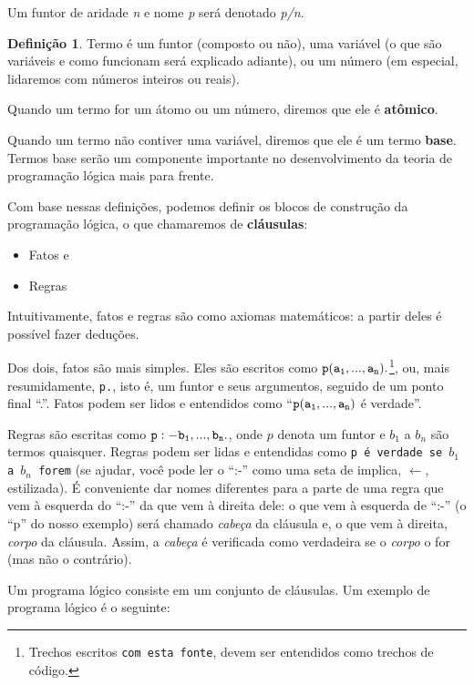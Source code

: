 \documentclass{article}
\theoremstyle{definition}
\newtheorem{definition}{Definição}[section]
\theoremstyle{remark}
\begin{document}
    Um funtor de aridade \textit{n} e nome \textit{p} será denotado \textit{p/n}.



  \theoremstyle{definition}
  \begin{definition}{Termo}
     é um funtor (composto ou não), uma variável (o que são variáveis e como funcionam será explicado adiante), ou um número (em especial, lidaremos com números inteiros ou reais).
  \end{definition}

  Quando um termo for um átomo ou um número, diremos que ele é \textbf{atômico}.

Quando um termo não contiver uma variável, diremos que ele é um termo \textbf{base}.
Termos base serão um componente importante no desenvolvimento da teoria de programação lógica mais para frente.

Com base nessas definições, podemos definir os blocos de construção da programação lógica, o que chamaremos de \textbf{cláusulas}:
\begin{itemize}
  \item Fatos e
  \item Regras
\end{itemize}

Intuitivamente, fatos e regras são como axiomas matemáticos: a partir deles é possível fazer deduções.

Dos dois, fatos são mais simples. Eles são escritos como  ${\tt p(a_1, ..., a_n).}$\footnote{Trechos escritos {\tt com esta fonte}, devem ser entendidos como trechos de código.},  ou, mais resumidamente, {\tt p.}, isto é, um funtor e seus argumentos, seguido de um ponto final ``.''. Fatos podem ser lidos e entendidos como ``${\tt p(a_1, ..., a_n)}$ é verdade''.

Regras são escritas como ${\tt p :- b_1, ..., b_n.}$, onde $p$ denota um funtor e $b_1$ a $b_n$ são termos quaisquer. Regras podem ser lidas e entendidas como {\tt p é verdade se $b_1$ a $b_n$ forem} (se ajudar, você pode ler o ``:-'' como uma seta de implica, $\leftarrow$, estilizada). É conveniente dar nomes diferentes para a parte de uma regra que vem à esquerda do ``:-'' da que vem à direita dele: o que vem à esquerda de ``:-'' (o ``p'' do nosso exemplo) será chamado \textit{cabeça} da cláusula e, o que vem à direita, \textit{corpo} da cláusula. Assim, a
\textit{cabeça} é verificada como verdadeira se o \textit{corpo} o for (mas não o contrário).

Um programa lógico consiste em um conjunto de cláusulas. Um exemplo de programa lógico é o seguinte:\\
\end{document}
